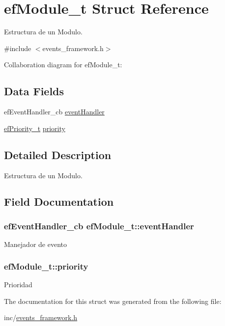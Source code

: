 \hypertarget{structefModule__t}{}\section{ef\+Module\+\_\+t Struct Reference}
\label{structefModule__t}


Estructura de un Modulo.  




{\ttfamily \#include $<$events\+\_\+framework.\+h$>$}



Collaboration diagram for ef\+Module\+\_\+t\+:
\subsection*{Data Fields}
\begin{DoxyCompactItemize}
\item 
ef\+Event\+Handler\+\_\+cb \hyperlink{structefModule__t_ad51a2b55d448b4a0ef4ee4bdcef8a6d9}{event\+Handler}
\item 
\hyperlink{events__framework_8h_a21efcb8ede4463085d4ec7e31b307da8}{ef\+Priority\+\_\+t} \hyperlink{structefModule__t_a9bb8bf3ab4361f869266a6ce0387e526}{priority}
\end{DoxyCompactItemize}


\subsection{Detailed Description}
Estructura de un Modulo. 

\subsection{Field Documentation}
\subsubsection[{\texorpdfstring{event\+Handler}{eventHandler}}]{\setlength{\rightskip}{0pt plus 5cm}ef\+Event\+Handler\+\_\+cb ef\+Module\+\_\+t\+::event\+Handler}\hypertarget{structefModule__t_ad51a2b55d448b4a0ef4ee4bdcef8a6d9}{}\label{structefModule__t_ad51a2b55d448b4a0ef4ee4bdcef8a6d9}
Manejador de evento 
\subsubsection[{\texorpdfstring{priority}{priority}}]{ ef\+Module\+\_\+t\+::priority}\hypertarget{structefModule__t_a9bb8bf3ab4361f869266a6ce0387e526}{}\label{structefModule__t_a9bb8bf3ab4361f869266a6ce0387e526}
Prioridad 

The documentation for this struct was generated from the following file\+:\begin{DoxyCompactItemize}
\item 
inc/\hyperlink{events__framework_8h}{events\+\_\+framework.\+h}\end{DoxyCompactItemize}
